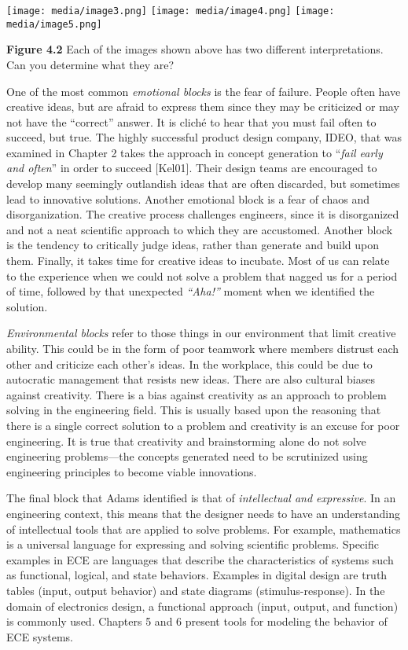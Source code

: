 \texttt{[image: media/image3.png]}
\texttt{[image: media/image4.png]}
\texttt{[image: media/image5.png]}

\textbf{Figure 4.2} Each of the images shown above has two different
interpretations. Can you determine what they are?

One of the most common \emph{emotional blocks} is the fear of failure.
People often have creative ideas, but are afraid to express them since
they may be criticized or may not have the ``correct'' answer. It is
cliché to hear that you must fail often to succeed, but true. The highly
successful product design company, IDEO, that was examined in Chapter 2
takes the approach in con­cept generation to ``\emph{fail early and
often}'' in order to succeed {[}Kel01{]}. Their design teams are
en­couraged to develop many seemingly outlandish ideas that are often
discarded, but some­times lead to innovative solutions. Another emotional
block is a fear of chaos and disorgani­zation. The creative process
challenges engineers, since it is disorganized and not a neat scien­tific
approach to which they are accustomed. Another block is the tendency to
critically judge ideas, rather than generate and build upon them.
Finally, it takes time for creative ideas to incubate. Most of us can
relate to the experience when we could not solve a problem that nagged
us for a period of time, followed by that unexpected \emph{``Aha!''}
moment when we identi­fied the solution.

\emph{Environmental blocks} refer to those things in our environment
that limit creative ability. This could be in the form of poor teamwork
where members distrust each other and criticize each other's ideas. In
the workplace, this could be due to autocratic management that resists
new ideas. There are also cultural biases against creativity. There is a
bias against creativity as an approach to problem solving in the
engineering field. This is usually based upon the reasoning that there
is a single correct solution to a problem and creativity is an excuse
for poor engineering. It is true that creativity and brainstorming alone
do not solve engineering problems---the concepts generated need to be
scrutinized using engineering principles to become viable innovations.

The final block that Adams identified is that of \emph{intellectual and
expressive}. In an engi­neering context, this means that the designer
needs to have an understanding of intellectual tools that are applied to
solve problems. For example, mathematics is a universal language for
expressing and solving scientific problems. Specific examples in ECE are
languages that de­scribe the characteristics of systems such as
functional, logical, and state behaviors. Examples in digital design are
truth tables (input, output behavior) and state diagrams
(stimulus-response). In the domain of electronics design, a functional
approach (input, output, and function) is commonly used. Chapters 5 and
6 present tools for modeling the behavior of ECE systems.

